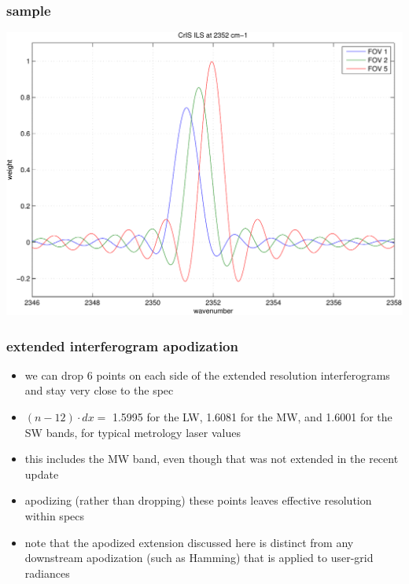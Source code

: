 \documentclass[11pt]{beamer}
\begin{document}
\begin{frame}
\frametitle{sample \ccast\ \ils}
\begin{center}
  \includegraphics[scale=0.5]{figures/ILS_SW_demo.pdf}
\end{center}
\end{frame}
\begin{frame}
\frametitle{extended interferogram apodization}

\begin{itemize}
  \item we can drop 6 points on each side of the extended resolution
    interferograms and stay very close to the {\opd} spec

 \item $(n - 12) \cdot dx =$ 1.5995 for the LW, 1.6081 for the MW,
   and 1.6001 for the SW bands, for typical metrology laser values

 \item this includes the MW band, even though that was not extended
   in the recent update

 \item apodizing (rather than dropping) these points leaves
   effective resolution within specs

 \item note that the apodized extension discussed here is distinct
   from any downstream apodization (such as Hamming) that is applied
   to user-grid radiances

\end{itemize}

\end{frame}
\end{document}
